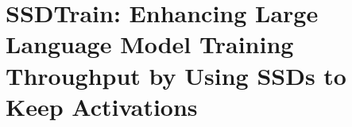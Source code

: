 \chapter{SSDTrain: Enhancing Large Language Model Training Throughput by Using SSDs to Keep Activations}
\label{ch:ssdtrain}






